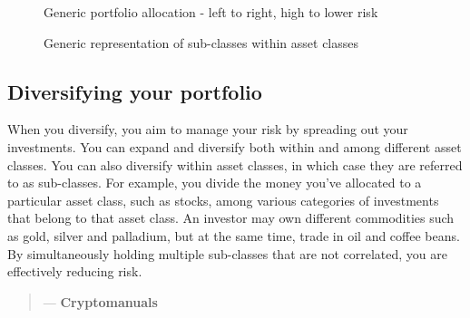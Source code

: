 \begin{figure}
    \centering
   
    
    \caption{Generic portfolio allocation - left to right, high to lower risk}
    \label{fig:portfolio allocation}
\end{figure}

\begin{figure}
    \centering
{}
    \caption{Generic representation of sub-classes within asset classes}
    \label{fig:subclasses}
\end{figure}


\subsection{Diversifying your portfolio}
When you diversify, you aim to manage your risk by spreading out your investments. You can expand and diversify both within and among different asset classes. You can also diversify within asset classes, in which case they are referred to as sub-classes. For example, you divide the money you've allocated to a particular asset class, such as stocks, among various categories of investments that belong to that asset class. An investor may own different commodities such as gold, silver and palladium, but at the same time, trade in oil and coffee beans. By simultaneously holding multiple sub-classes that are not correlated, you are effectively reducing risk. 
\begin{quotation}

  \textit{}
  \begin{flushright}
    \small{--- \textbf{Cryptomanuals}}
  \end{flushright}

\end{quotation}


